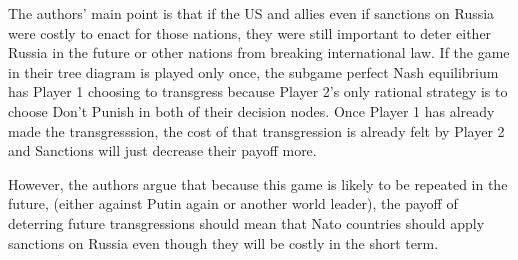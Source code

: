 \documentclass[addpoints]{exam}
\begin{document}
\begin{questions}

\begin{solution}

The authors' main point is that if the US and allies even if sanctions on Russia were costly to enact for those nations,
they were still important to deter either Russia in the future or other nations from breaking international law.
If the game in their tree diagram is played only once, the subgame perfect Nash equilibrium has Player 1 choosing to transgress
because Player 2's only rational strategy is to choose Don't Punish in both of their decision nodes.
Once Player 1 has already made the transgresssion, the cost of that transgression is already felt by Player 2 
and Sanctions will just decrease their payoff more.

However, the authors argue that because this game is likely to be repeated in the future, 
(either against Putin again or another world leader),
the payoff of deterring future transgressions should mean that Nato countries should apply sanctions on Russia
even though they will be costly in the short term.

\end{solution}
\end{questions}
\end{document}
